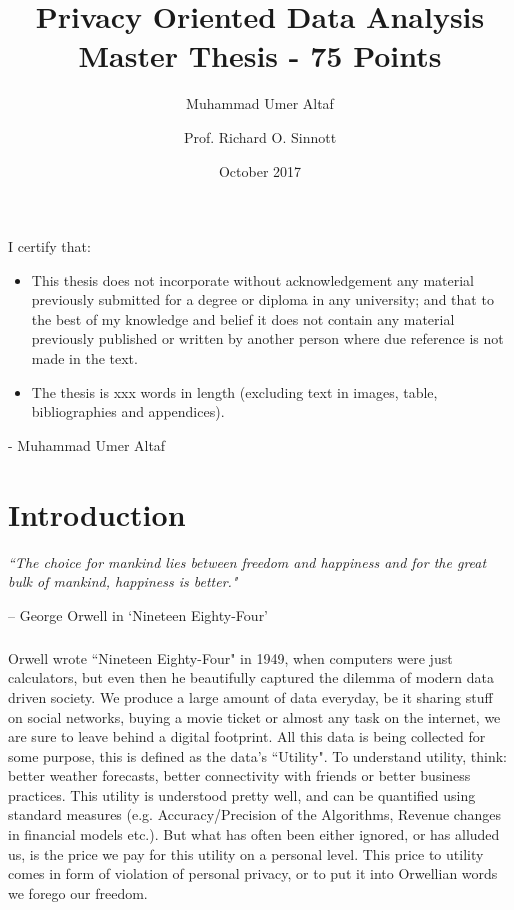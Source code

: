 \documentclass[12pt]{report}
\title{Privacy Oriented Data Analysis\\\large{Master Thesis - 75 Points}}
\author[1]{Muhammad Umer Altaf}
\author[1]{Prof. Richard O. Sinnott}
\affil[1]{The University of Melbourne\\School of Computing and Information Systems}
\date{October 2017}
\theoremstyle{named}
\begin{document}
\maketitle
\setcounter{tocdepth}{1}
\tableofcontents
\pagebreak
I certify that:
\begin{itemize}
\item This thesis does not incorporate without acknowledgement any material previously submitted for a degree or diploma in any university; and that to the best of my knowledge and belief it does not contain any material
previously published or written by another person where due reference is not made in the text.

\item The thesis is xxx words in length (excluding text in images, table, bibliographies and appendices).
\end{itemize}
- Muhammad Umer Altaf
\pagebreak
\thispagestyle{empty}
 
\listoffigures
 
\listoftables
 
\newpage

\chapter{Introduction}


\textit{``The choice for mankind lies between freedom and happiness and for the great bulk of mankind, happiness is better."}

{\raggedleft -- George Orwell in `Nineteen Eighty-Four'\quad\par}

\paragraph{}
Orwell wrote ``Nineteen Eighty-Four" in 1949, when computers were just calculators, but even then he beautifully captured the dilemma of modern data driven society. We produce a large amount of data everyday, be it sharing stuff on social networks, buying a movie ticket or almost any task on the internet, we are sure to leave behind a digital footprint. All this data is being collected for some purpose, this is defined as the data's ``Utility". To understand utility, think: better weather forecasts, better connectivity with friends or better business practices. This utility is understood pretty well, and can be quantified using standard measures (e.g. Accuracy/Precision of the Algorithms, Revenue changes in financial models etc.). But what has often been either ignored, or has alluded us, is the price we pay for this utility on a personal level. This price to utility comes in form of violation of personal privacy, or to put it into Orwellian words we forego our freedom.
\end{document}
